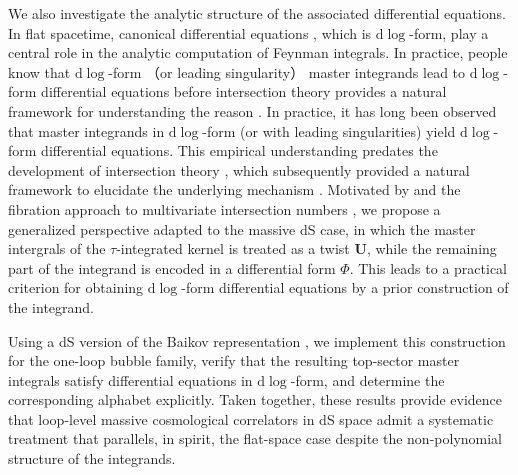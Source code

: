 \documentclass[%
 reprint,
 amsmath,amssymb,
 aps,
prd,
]{revtex4-2}
\def\di{{\mathrm{d}}}
\begin{document}
We also investigate the analytic structure of the associated differential equations. In flat spacetime, canonical differential equations \cite{Henn:2013pwa}, which is \(\di\log\)-form,  play a central role in the analytic computation of Feynman integrals. In practice, people know that \(\di\log\)-form （or leading singularity） \cite{Arkani-Hamed:2012zlh, Bern:2014kca, Chicherin:2018old, Chen:2020uyk, Chen:2022lzr,Henn:2020lye, Dlapa:2021qsl} master integrands lead to \(\di\log\)-form differential equations before intersection theory \cite{Mastrolia:2018uzb,Frellesvig:2019uqt,Mizera:2019ose,Chestnov:2022xsy,Weinzierl:2020xyy,Chen:2020uyk,Chen:2022lzr,Jiang:2023oyq,Crisanti:2024onv,Frellesvig:2020qot,Mizera:2019vvs,Chestnov:2022alh,Caron-Huot:2021xqj,Caron-Huot:2021iev,Giroux:2022wav,Duhr:2024rxe,Fontana:2023amt,Brunello:2023rpq,Brunello:2024tqf,Huang:2026xnq} provides a natural framework for understanding the reason   \cite{Chen:2023kgw,Chen:2024ovh}. 
In practice, it has long been observed that master integrands in \(\di\log\)-form (or with leading singularities) \cite{Arkani-Hamed:2012zlh, Bern:2014kca, Chicherin:2018old, Chen:2020uyk, Chen:2022lzr,Henn:2020lye, Dlapa:2021qsl} yield 
 \(\di\log\)-form differential equations. This empirical understanding predates the development of intersection theory \cite{Mastrolia:2018uzb,Frellesvig:2019uqt,Mizera:2019ose,Chestnov:2022xsy,Weinzierl:2020xyy,Chen:2020uyk,Chen:2022lzr,Jiang:2023oyq,Crisanti:2024onv,Frellesvig:2020qot,Mizera:2019vvs,Chestnov:2022alh,Caron-Huot:2021xqj,Caron-Huot:2021iev,Giroux:2022wav,Duhr:2024rxe,Fontana:2023amt,Brunello:2023rpq,Brunello:2024tqf,Huang:2026xnq}, which subsequently provided a natural framework to elucidate the underlying mechanism \cite{Chen:2023kgw,Chen:2024ovh}.
Motivated by \cite{Chen:2023kgw,Chen:2024ovh} and the fibration  approach to multivariate intersection numbers \cite{Frellesvig:2019uqt}, we propose a generalized perspective adapted to the massive dS case, in which the master intergrals of the \(\tau\)-integrated kernel is treated as a twist \(\mathbf U\), while the remaining part of the integrand is encoded in a differential form \(\Phi\). This leads to a practical criterion for obtaining \(\di\log\)-form differential equations by  a prior construction of the integrand.

Using a dS version of the Baikov representation \cite{Baikov:1996iu}, we implement this construction for the one-loop bubble family, verify that the resulting top-sector master integrals satisfy differential equations in \(\di\log\)-form, and determine the corresponding alphabet explicitly. Taken together, these results provide evidence that loop-level massive cosmological correlators in dS space admit a systematic treatment that parallels, in spirit, the flat-space case despite the non-polynomial structure of the integrands.
\end{document}
